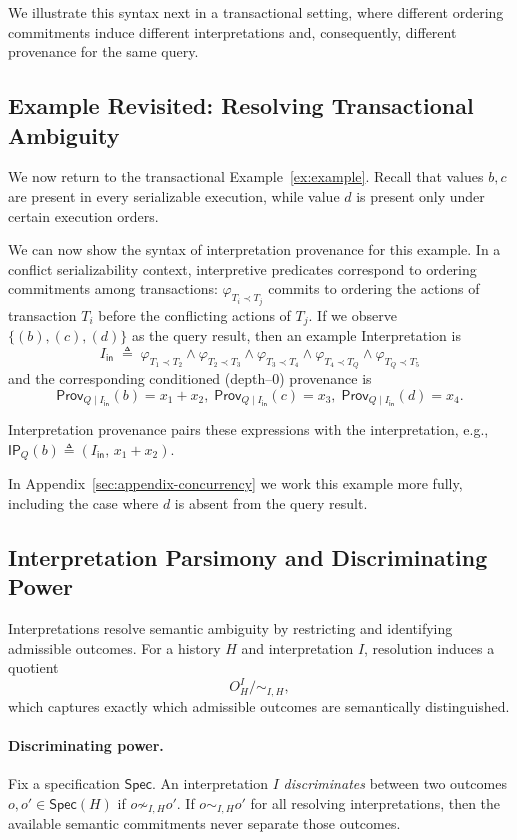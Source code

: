 \documentclass[acmsmall,nonacm]{acmart}
\theoremstyle{remark}
\numberwithin{definition}{section}
\numberwithin{theorem}{section}
\numberwithin{lemma}{section}
\numberwithin{corollary}{section}
\numberwithin{remark}{section}
\numberwithin{example}{section}
\numberwithin{observation}{section}
\numberwithin{assumption}{section}
\newcommand{\Spec}{\mathsf{Spec}}
\newcommand{\Prov}{\mathsf{Prov}}
\begin{document}
We illustrate this syntax next in a transactional setting, where
different ordering commitments induce different interpretations and,
consequently, different provenance for the same query.

\subsection{Example Revisited: Resolving Transactional Ambiguity}
\label{sec:concurrency}

We now return to the transactional Example~\ref{ex:example}.
Recall that values $b, c$ are present in every serializable execution, while value $d$
is present only under certain execution orders.

We can now show the syntax of interpretation provenance for this example.
In a conflict serializability context, interpretive predicates correspond to ordering
commitments among transactions: $\varphi_{T_i \prec T_j}$ commits to
ordering the actions of transaction $T_i$ before the conflicting actions of $T_j$.
If we observe $\{(b), (c), (d)\}$ as the query result, then an example Interpretation is 
\[
I_{\mathsf{in}} \;\triangleq\; \varphi_{T_1 \prec T_2} \wedge \varphi_{T_2 \prec T_3} \wedge \varphi_{T_3 \prec T_4} \wedge \varphi_{T_4 \prec T_Q} \wedge \varphi_{T_Q \prec T_5}
\]
and the corresponding conditioned (depth--0) provenance is
\[
  \Prov_{Q \mid I_{\mathsf{in}}}(b)=x_1+x_2,\;
  \Prov_{Q \mid I_{\mathsf{in}}}(c)=x_3,\;
  \Prov_{Q \mid I_{\mathsf{in}}}(d)=x_4.
\]

Interpretation provenance pairs these expressions with the interpretation,
e.g., $\mathsf{IP}_Q(b) \triangleq (I_{\mathsf{in}},\, x_1+x_2)$.

In Appendix~\ref{sec:appendix-concurrency} we work this example more fully, including 
the case where $d$ is absent from the query result.

\subsection{Interpretation Parsimony and Discriminating Power}
\label{sec:parsimony}

Interpretations resolve semantic ambiguity by restricting and identifying
admissible outcomes.
For a history $H$ and interpretation $I$, resolution induces a quotient
\[
  O_H^I \big/ {\sim_{I,H}},
\]
which captures exactly which admissible outcomes are semantically distinguished.

\paragraph{Discriminating power.}
Fix a specification $\Spec$.
An interpretation $I$ \emph{discriminates} between two outcomes
$o,o' \in \Spec(H)$ if $o \not\sim_{I,H} o'$.
If $o \sim_{I,H} o'$ for all resolving interpretations, then the available
semantic commitments never separate those outcomes.
\end{document}
